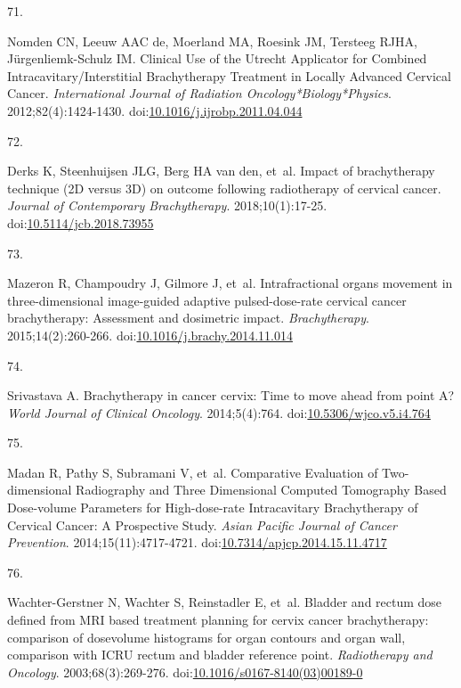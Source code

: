 \documentclass[
  a4paper,
]{scrreprt}
\newlength{\cslhangindent}
\newlength{\csllabelwidth}
\newlength{\cslentryspacingunit} %
\newenvironment{CSLReferences}[2] %
 {%
  \setlength{\parindent}{0pt}
  \ifodd #1
  \let\oldpar\par
  \def\par{\hangindent=\cslhangindent\oldpar}
  \fi
  \setlength{\parskip}{#2\cslentryspacingunit}
 }%
 {}
\newcommand{\CSLLeftMargin}[1]{\parbox[t]{\csllabelwidth}{#1}}
\newcommand{\CSLRightInline}[1]{\parbox[t]{\linewidth - \csllabelwidth}{#1}\break}
\begin{document}
\begin{CSLReferences}{0}{0}
\leavevmode{}%
\CSLLeftMargin{71. }%
\CSLRightInline{Nomden CN, Leeuw AAC de, Moerland MA, Roesink JM,
Tersteeg RJHA, Jürgenliemk-Schulz IM. Clinical Use of the Utrecht
Applicator for Combined Intracavitary/Interstitial Brachytherapy
Treatment in Locally Advanced Cervical Cancer. \emph{International
Journal of Radiation Oncology*Biology*Physics}. 2012;82(4):1424-1430.
doi:\href{https://doi.org/10.1016/j.ijrobp.2011.04.044}{10.1016/j.ijrobp.2011.04.044}}

\leavevmode{}%
\CSLLeftMargin{72. }%
\CSLRightInline{Derks K, Steenhuijsen JLG, Berg HA van den, et~al.
Impact of brachytherapy technique (2D versus 3D) on outcome following
radiotherapy of cervical cancer. \emph{Journal of Contemporary
Brachytherapy}. 2018;10(1):17-25.
doi:\href{https://doi.org/10.5114/jcb.2018.73955}{10.5114/jcb.2018.73955}}

\leavevmode{}%
\CSLLeftMargin{73. }%
\CSLRightInline{Mazeron R, Champoudry J, Gilmore J, et~al.
Intrafractional organs movement in three-dimensional image-guided
adaptive pulsed-dose-rate cervical cancer brachytherapy: Assessment and
dosimetric impact. \emph{Brachytherapy}. 2015;14(2):260-266.
doi:\href{https://doi.org/10.1016/j.brachy.2014.11.014}{10.1016/j.brachy.2014.11.014}}

\leavevmode{}%
\CSLLeftMargin{74. }%
\CSLRightInline{Srivastava A. Brachytherapy in cancer cervix: Time to
move ahead from point A? \emph{World Journal of Clinical Oncology}.
2014;5(4):764.
doi:\href{https://doi.org/10.5306/wjco.v5.i4.764}{10.5306/wjco.v5.i4.764}}

\leavevmode{}%
\CSLLeftMargin{75. }%
\CSLRightInline{Madan R, Pathy S, Subramani V, et~al. Comparative
Evaluation of Two-dimensional Radiography and Three Dimensional Computed
Tomography Based Dose-volume Parameters for High-dose-rate Intracavitary
Brachytherapy of Cervical Cancer: A Prospective Study. \emph{Asian
Pacific Journal of Cancer Prevention}. 2014;15(11):4717-4721.
doi:\href{https://doi.org/10.7314/apjcp.2014.15.11.4717}{10.7314/apjcp.2014.15.11.4717}}

\leavevmode{}%
\CSLLeftMargin{76. }%
\CSLRightInline{Wachter-Gerstner N, Wachter S, Reinstadler E, et~al.
Bladder and rectum dose defined from MRI based treatment planning for
cervix cancer brachytherapy: comparison of dose{\textendash}volume
histograms for organ contours and organ wall, comparison with ICRU
rectum and bladder reference point. \emph{Radiotherapy and Oncology}.
2003;68(3):269-276.
doi:\href{https://doi.org/10.1016/s0167-8140(03)00189-0}{10.1016/s0167-8140(03)00189-0}}


\end{CSLReferences}
\end{document}
